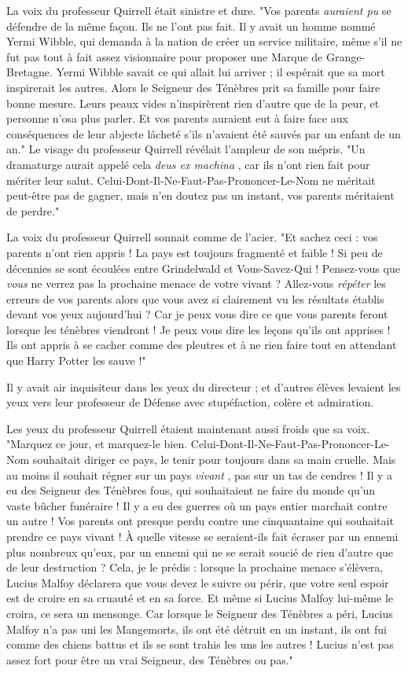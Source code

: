 La voix du professeur Quirrell était sinistre et dure. "Vos parents \emph{auraient pu}  se défendre de la même façon. Ils ne l'ont pas fait. Il y avait un homme nommé Yermi Wibble, qui demanda à la nation de créer un service militaire, même s'il ne fut pas tout à fait assez visionnaire pour proposer une Marque de Grange-Bretagne. Yermi Wibble savait ce qui allait lui arriver ; il espérait que sa mort inspirerait les autres. Alors le Seigneur des Ténèbres prit sa famille pour faire bonne mesure. Leurs peaux vides n'inspirèrent rien d'autre que de la peur, et personne n'osa plus parler. Et vos parents auraient eut à faire face aux conséquences de leur abjecte lâcheté s'ils n'avaient été sauvés par un enfant de un an." Le visage du professeur Quirrell révélait l'ampleur de son mépris. "Un dramaturge aurait appelé cela \emph{deus ex machina} , car ils n'ont rien fait pour mériter leur salut. Celui-Dont-Il-Ne-Faut-Pas-Prononcer-Le-Nom ne méritait peut-être pas de gagner, mais n'en doutez pas un instant, vos parents méritaient de perdre."

La voix du professeur Quirrell sonnait comme de l'acier. "Et sachez ceci : vos parents n'ont rien appris ! La pays est toujours fragmenté et faible ! Si peu de décennies se sont écoulées entre Grindelwald et Vous-Savez-Qui ! Pensez-vous que \emph{vous}  ne verrez pas la prochaine menace de votre vivant ? Allez-vous \emph{répéter}  les erreurs de vos parents alors que vous avez si clairement vu les résultats établis devant vos yeux aujourd'hui ? Car je peux vous dire ce que vous parents feront lorsque les ténèbres viendront ! Je peux vous dire les leçons qu'ils ont apprises ! Ils ont appris à se cacher comme des pleutres et à ne rien faire tout en attendant que Harry Potter les sauve !"

Il y avait air inquisiteur dans les yeux du directeur ; et d'autres élèves levaient les yeux vers leur professeur de Défense avec stupéfaction, colère et admiration.

Les yeux du professeur Quirrell étaient maintenant aussi froids que sa voix. "Marquez ce jour, et marquez-le bien. Celui-Dont-Il-Ne-Faut-Pas-Prononcer-Le-Nom souhaitait diriger ce pays, le tenir pour toujours dans sa main cruelle. Mais au moins il souhait régner sur un pays \emph{vivant} , pas sur un tas de cendres ! Il y a eu des Seigneur des Ténèbres fous, qui souhaitaient ne faire du monde qu'un vaste bûcher funéraire ! Il y a eu des guerres où un pays entier marchait contre un autre ! Vos parents ont presque perdu contre une cinquantaine qui souhaitait prendre ce pays vivant ! À quelle vitesse se seraient-ils fait écraser par un ennemi plus nombreux qu'eux, par un ennemi qui ne se serait soucié de rien d'autre que de leur destruction ? Cela, je le prédis : lorsque la prochaine menace s'élèvera, Lucius Malfoy déclarera que vous devez le suivre ou périr, que votre seul espoir est de croire en sa cruauté et en sa force. Et même si Lucius Malfoy lui-même le croira, ce sera un mensonge. Car lorsque le Seigneur des Ténèbres a péri, Lucius Malfoy n'a pas uni les Mangemorts, ils ont été détruit en un instant, ils ont fui comme des chiens battus et ils se sont trahis les uns les autres ! Lucius n'est pas assez fort pour être un vrai Seigneur, des Ténèbres ou pas."

